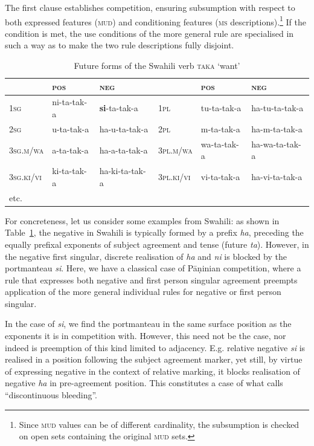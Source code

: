 The first clause establishes competition, ensuring subsumption with
respect to both expressed features (\textsc{mud}) and conditioning
features (\textsc{ms} descriptions).\footnote{Since \textsc{mud} values
  can be of different cardinality, the subsumption  is checked
  on  open sets containing the original \textsc{mud} sets. } If the condition is met, the use
conditions of the more general rule are specialised in such a way as
to make the two rule descriptions fully disjoint.


\begin{table}
\setlength{\tabcolsep}{.3em}
\centering
\begin{tabular}{llllll}
\toprule 
 & \textsc{pos} & \textsc{neg}     &             & \textsc{pos} & \textsc{neg}\\
\midrule 
\textsc{1sg} & ni-{ta}-tak-{a} & \textbf{{si}}-{ta}-tak-{a}        & \textsc{1pl} & tu-{ta}-tak-{a}     & {ha}-tu-{ta}-tak-{a}\\
\textsc{2sg} & u-{ta}-tak-{a} & {ha}-u-{ta}-tak-{a}        & \textsc{2pl} & m-{ta}-tak-{a}      & {ha}-m-{ta}-tak-{a}\\
\textsc{3sg.m/wa} & a-{ta}-tak-{a} & {ha}-a-{ta}-tak-{a}    & \textsc{3pl.m/wa} & wa-{ta}-tak-{a} & {ha}-wa-{ta}-tak-{a}\\ 
\textsc{3sg.ki/vi} & ki-{ta}-tak-{a} & {ha}-ki-{ta}-tak-{a} & \textsc{3pl.ki/vi} & vi-{ta}-tak-{a} & {ha}-vi-{ta}-tak-{a}\\
etc. & &\\
\bottomrule
\end{tabular}
\caption{Future forms of the Swahili verb  \textsc{taka} ‘want’}
\label{tab:SwahiliPortmanteau}
\end{table}

For concreteness, let us consider some examples from Swahili: as shown
in Table~\ref{tab:SwahiliPortmanteau}, the negative in Swahili is
typically formed by a prefix \textit{ha}, preceding the equally
prefixal exponents of
subject agreement and tense (future \textit{ta}). However, in the
negative first singular, discrete realisation of \textit{ha} and
\textit{ni} is blocked by the portmanteau \textit{si}. Here, we have
a classical case of   Pāṇinian competition, where a rule that
expresses both negative and first person singular agreement preempts
application of the more general individual rules for negative or first
person singular.  



In the case of \textit{si}, we find the portmanteau in the same
surface position as the exponents it is in competition with.  However,
this need not be the case, nor indeed is preemption of this kind
limited to adjacency. E.g.  relative negative \textit{si} is realised
in a position following the subject agreement marker, yet still, by
virtue of expressing negative in the context of relative marking, it
blocks realisation of negative \textit{ha} in pre-agreement position. This constitutes a case of what \citet{Noyer92} calls ``discontinuous
bleeding''. 

